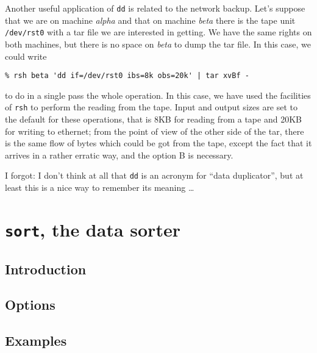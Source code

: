 Another useful application of {\tt dd} is related to the network backup. Let's
suppose that we are on machine {\sl alpha} and that on machine {\sl beta}
there is the tape unit {\tt /dev/rst0} with a tar file we are interested
in getting. We have the same rights on both machines, but there is no
space on {\sl beta} to dump the tar file. In this case, we could write
\begin{verbatim}
% rsh beta 'dd if=/dev/rst0 ibs=8k obs=20k' | tar xvBf - 
\end{verbatim}
to do in a single pass the whole operation. In this case, we have used the
facilities of {\tt rsh} to perform the reading from the tape. Input and
output sizes are set to the default for these operations, that is 8KB for
reading from a tape and 20KB for writing to ethernet; from the point of
view of the other side of the tar, there is the same flow of bytes which
could be got from the tape, except the fact that it arrives in a rather
erratic way, and the option B is necessary.

I forgot: I don't think at all that {\tt dd} is an acronym for ``data
duplicator'', but at least this is a nice way to remember its meaning
\ldots

\section{{\tt sort}, the data sorter}

\subsection{Introduction}

\subsection{Options}

\subsection{Examples}


